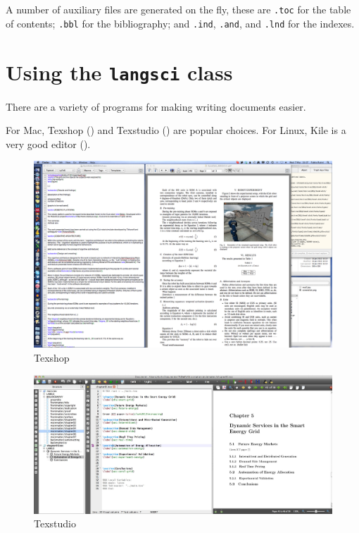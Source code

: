 A number of auxiliary files are generated on the fly, these are  \verb+.toc+ for the table of contents; \verb+.bbl+ for the bibliography; and \verb+.ind+, \verb+.and+, and \verb+.lnd+ for the indexes.  

\section{Using the \texttt{langsci} class}
There are a variety of programs for making writing \latex documents easier.

For Mac, Texshop () and Texstudio () are popular choices.
For Linux, Kile is a very good \latex editor ().



\begin{figure}
\includegraphics[height=.4\textheight]{texshop.png}
\caption{Texshop}
\label{fig:latex:texshop} 
\end{figure}

\begin{figure}
\includegraphics[width=\textwidth]{texstudio.jpg}
\caption{Texstudio}
\label{fig:latex:texstudio} 
\end{figure}


